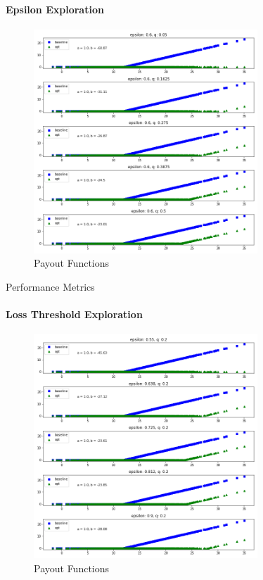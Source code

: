 \documentclass[11pt]{article}
\begin{document}
        \paragraph*{Epsilon Exploration}
            \begin{figure}[H]
                \centering
                \caption{Payout Functions}
                \includegraphics[width=0.75\textwidth]{../../output/figures/Premium/epsilon_exploration_intercept.png}
            \end{figure}

            \begin{table}[H]
                \centering
                \caption{Performance Metrics}
                
            \end{table}

            \FloatBarrier

        \paragraph*{Loss Threshold Exploration}
            \begin{figure}[H]
                \centering
                \caption{Payout Functions}
                \includegraphics[width=0.75\textwidth]{../../output/figures/Premium/loss_q_exploration_intercept.png}
            \end{figure}
\end{document}
